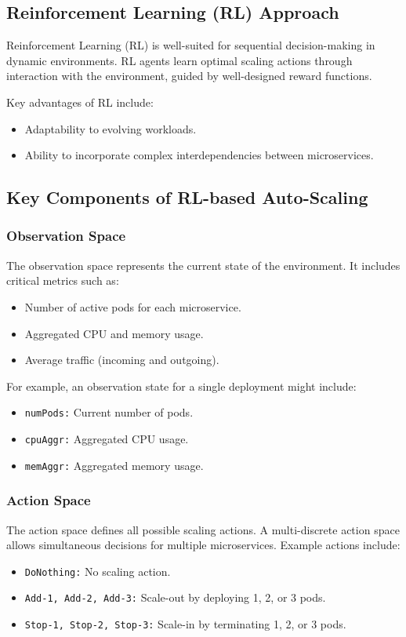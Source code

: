 \documentclass[conference]{IEEEtran}
\begin{document}
\subsection{Reinforcement Learning (RL) Approach}
Reinforcement Learning (RL) is well-suited for sequential decision-making in dynamic environments. RL agents learn optimal scaling actions through interaction with the environment, guided by well-designed reward functions.

Key advantages of RL include:
\begin{itemize}
    \item Adaptability to evolving workloads.
    \item Ability to incorporate complex interdependencies between microservices.
\end{itemize}

\subsection{Key Components of RL-based Auto-Scaling}

\subsubsection{Observation Space}
The observation space represents the current state of the environment. It includes critical metrics such as:
\begin{itemize}
    \item Number of active pods for each microservice.
    \item Aggregated CPU and memory usage.
    \item Average traffic (incoming and outgoing).
\end{itemize}

For example, an observation state for a single deployment might include:
\begin{itemize}
    \item \texttt{numPods:} Current number of pods.
    \item \texttt{cpuAggr:} Aggregated CPU usage.
    \item \texttt{memAggr:} Aggregated memory usage.
\end{itemize}

\subsubsection{Action Space}
The action space defines all possible scaling actions. A multi-discrete action space allows simultaneous decisions for multiple microservices. Example actions include:
\begin{itemize}
    \item \texttt{DoNothing:} No scaling action.
    \item \texttt{Add-1, Add-2, Add-3:} Scale-out by deploying 1, 2, or 3 pods.
    \item \texttt{Stop-1, Stop-2, Stop-3:} Scale-in by terminating 1, 2, or 3 pods.
\end{itemize}
\end{document}

